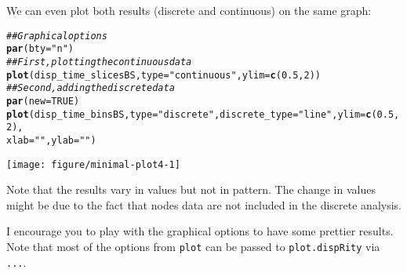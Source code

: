\documentclass{article}\usepackage[]{graphicx}\usepackage[]{color}
\makeatletter
\newcommand{\hlnum}[1]{\textcolor[rgb]{0.686,0.059,0.569}{#1}}%
\newcommand{\hlstr}[1]{\textcolor[rgb]{0.192,0.494,0.8}{#1}}%
\newcommand{\hlcom}[1]{\textcolor[rgb]{0.678,0.584,0.686}{\textit{#1}}}%
\newcommand{\hlstd}[1]{\textcolor[rgb]{0.345,0.345,0.345}{#1}}%
\newcommand{\hlkwc}[1]{\textcolor[rgb]{0.333,0.667,0.333}{#1}}%
\newcommand{\hlkwd}[1]{\textcolor[rgb]{0.737,0.353,0.396}{\textbf{#1}}}%
\newenvironment{kframe}{%
 \def\at@end@of@kframe{}%
 \ifinner\ifhmode%
  \def\at@end@of@kframe{\end{minipage}}%
  \begin{minipage}{\columnwidth}%
 \fi\fi%
 \def\FrameCommand##1{\hskip\@totalleftmargin \hskip-\fboxsep
 \colorbox{shadecolor}{##1}\hskip-\fboxsep
     \hskip-\linewidth \hskip-\@totalleftmargin \hskip\columnwidth}%
 \MakeFramed {\advance\hsize-\width
   \@totalleftmargin\z@ \linewidth\hsize
   \@setminipage}}%
 {\par\unskip\endMakeFramed%
 \at@end@of@kframe}
\newenvironment{knitrout}{}{} %
\makeatother
\begin{document}
We can even plot both results (discrete and continuous) on the same graph:

\begin{knitrout}
\color{fgcolor}\begin{kframe}
\begin{alltt}
\hlcom{## Graphical options}
\hlkwd{par}\hlstd{(}\hlkwc{bty} \hlstd{=} \hlstr{"n"}\hlstd{)}
\hlcom{## First, plotting the continuous data}
\hlkwd{plot}\hlstd{(disp_time_slicesBS,} \hlkwc{type} \hlstd{=} \hlstr{"continuous"}\hlstd{,} \hlkwc{ylim}\hlstd{=}\hlkwd{c}\hlstd{(}\hlnum{0.5}\hlstd{,}\hlnum{2}\hlstd{))}
\hlcom{## Second, adding the discrete data}
\hlkwd{par}\hlstd{(}\hlkwc{new} \hlstd{=} \hlnum{TRUE}\hlstd{)}
\hlkwd{plot}\hlstd{(disp_time_binsBS,} \hlkwc{type} \hlstd{=} \hlstr{"discrete"}\hlstd{,} \hlkwc{discrete_type} \hlstd{=} \hlstr{"line"}\hlstd{,} \hlkwc{ylim}\hlstd{=}\hlkwd{c}\hlstd{(}\hlnum{0.5}\hlstd{,}\hlnum{2}\hlstd{),}
    \hlkwc{xlab}\hlstd{=}\hlstr{""}\hlstd{,} \hlkwc{ylab}\hlstd{=}\hlstr{""}\hlstd{)}
\end{alltt}
\end{kframe}

{\centering \texttt{[image: figure/minimal-plot4-1]} 

}



\end{knitrout}

Note that the results vary in values but not in pattern.
The change in values might be due to the fact that nodes data are not included in the discrete analysis.

I encourage you to play with the graphical options to have some prettier results.
Note that most of the options from \texttt{plot} can be passed to \texttt{plot.dispRity} via \texttt{...}.
\end{document}
